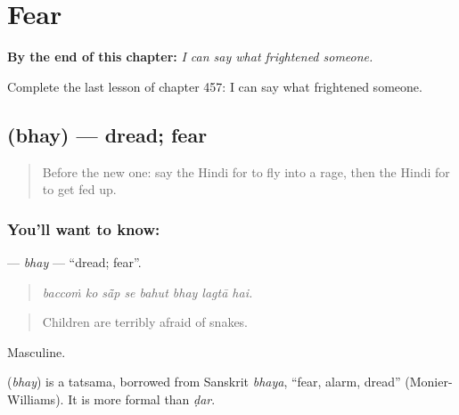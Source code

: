 
\chapter{Fear}
\label{ch:hi-fear}

\begin{chapteropening}
\textbf{By the end of this chapter:} \emph{I can say what frightened someone.}

Complete the last lesson of chapter 457: I can say what frightened someone.
\end{chapteropening}

\section[\texorpdfstring{\hi{भय} (bhay)}{भय (bhay)}]{ (bhay) — dread; fear}

\label{lesson:HI-C457-bhay}



\begin{quote}
Before the new one: say the Hindi for to fly into a rage, then the Hindi for to get fed up.
\end{quote}

\subsection*{You'll want to know: }
\textbf{} — \emph{bhay} — \textquotedblleft{}dread; fear\textquotedblright{}.

\begin{quote}
       
\end{quote}

\begin{quote}
\emph{baccoṁ ko sā̃p se bahut bhay lagtā hai.}
\end{quote}

\begin{quote}
Children are terribly afraid of snakes.
\end{quote}

Masculine.

\begin{cousinweb}
\textbf{} (\emph{bhay}) is a tatsama, borrowed from Sanskrit \emph{bhaya}, \textquotedblleft{}fear, alarm, dread\textquotedblright{} (Monier-Williams). It is more formal than \emph{ḍar}.
\end{cousinweb}

